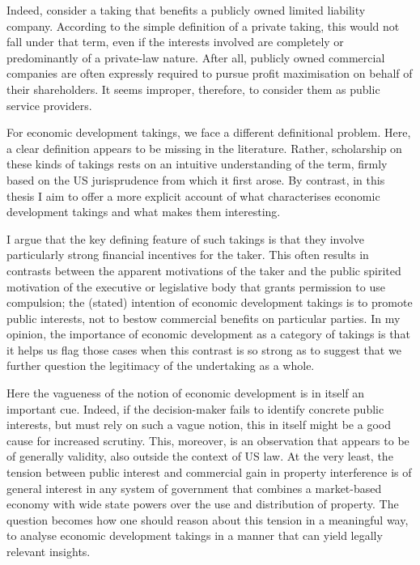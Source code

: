 \documentclass{book} %
\begin{document}
Indeed, consider a taking that benefits a publicly owned limited liability company. According to the simple definition of a private taking, this would not fall under that term, even if the interests involved are completely or predominantly of a private-law nature. After all, publicly owned commercial companies are often expressly required to pursue profit maximisation on behalf of their shareholders. It seems improper, therefore, to consider them as public service providers.

For economic development takings, we face a different definitional problem. Here, a clear definition appears to be missing in the literature. Rather, scholarship on these kinds of takings rests on an intuitive understanding of the term, firmly based on the US jurisprudence from which it first arose. 
By contrast, in this thesis I aim to offer a more explicit account of what characterises economic development takings and what makes them interesting.

I argue that the key defining feature of such takings is that they involve particularly strong financial incentives for the taker. This often results in contrasts between the apparent motivations of the taker and the public spirited motivation of the executive or legislative body that grants permission to use compulsion; the (stated) intention of economic development takings is to promote public interests, not to bestow commercial benefits on particular parties. In my opinion, the  importance of economic development as a category of takings is that it helps us flag those cases when this contrast is so strong as to suggest that we further question the legitimacy of the undertaking as a whole.

Here the vagueness of the notion of economic development is in itself an important cue. Indeed, if the decision-maker fails to identify concrete public interests, but must rely on such a vague notion, this in itself might be a good cause for increased scrutiny. This, moreover, is an observation that appears to be of generally validity, also outside the context of US law. At the very least, the tension between public interest and commercial gain in property interference is of general interest in any system of government that combines a market-based economy with wide state powers over the use and distribution of property. The question becomes how one should reason about this tension in a meaningful way, to analyse economic development takings in a manner that can yield legally relevant insights.
\end{document}
